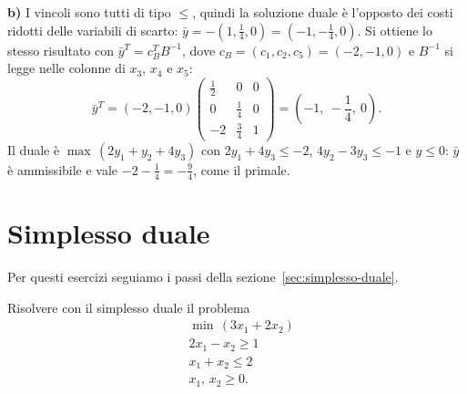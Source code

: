 \textbf{b)} I vincoli sono tutti di tipo $\le$, quindi la soluzione duale è l'opposto dei costi ridotti delle variabili di scarto: $\bar{y} = -(1, \frac14, 0) = (-1, -\frac14, 0)$. Si ottiene lo stesso risultato con $\bar{y}^T = c_B^T B^{-1}$, dove $c_B = (c_1, c_2, c_5) = (-2, -1, 0)$ e $B^{-1}$ si legge nelle colonne di $x_3$, $x_4$ e $x_5$:
\[
\bar{y}^T = (-2, -1, 0) \begin{pmatrix} \frac12 & 0 & 0 \\ 0 & \frac14 & 0 \\ -2 & \frac34 & 1 \end{pmatrix} = \left(-1,\ -\frac14,\ 0\right).
\]
Il duale è $\max\, (2y_1 + y_2 + 4y_3)$ con $2y_1 + 4y_3 \le -2$, $4y_2 - 3y_3 \le -1$ e $y \le 0$: $\bar{y}$ è ammissibile e vale $-2 - \frac14 = -\frac94$, come il primale.

\section{Simplesso duale}\label{sec:es-simplesso-duale}
Per questi esercizi seguiamo i passi della sezione~\ref{sec:simplesso-duale}.

\begin{esercizio}
Risolvere con il simplesso duale il problema
\[
\begin{aligned}
&\min\, (3x_1 + 2x_2) \\
&2x_1 - x_2 \ge 1 \\
&x_1 + x_2 \le 2 \\
&x_1,\, x_2 \ge 0.
\end{aligned}
\]
\end{esercizio}

